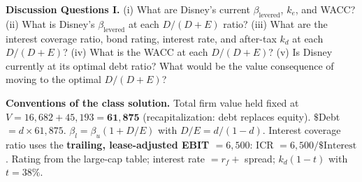 \textbf{Discussion Questions I.} (i) What are Disney's current $\beta_{\text{levered}}$, $k_e$, and WACC? (ii) What is Disney's $\beta_{\text{levered}}$ at each $D/(D+E)$ ratio? (iii) What are the interest coverage ratio, bond rating, interest rate, and after-tax $k_d$ at each $D/(D+E)$? (iv) What is the WACC at each $D/(D+E)$? (v) Is Disney currently at its optimal debt ratio? What would be the value consequence of moving to the optimal $D/(D+E)$?

\begin{exbox}
\textbf{Conventions of the class solution.} Total firm value held fixed at $V=16{,}682+45{,}193=\mathbf{61{,}875}$ (recapitalization: debt replaces equity). $\$$Debt $=d\times61{,}875$. $\beta_l=\beta_u(1+D/E)$ with $D/E=d/(1-d)$. Interest coverage ratio uses the \textbf{trailing, lease-adjusted EBIT $=6{,}500$}: ICR $=6{,}500/\$\text{Interest}$. Rating from the large-cap table; interest rate $=r_f+$ spread; $k_d(1-t)$ with $t=38\%$.


\end{exbox}
